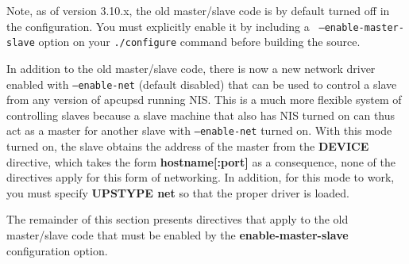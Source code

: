 Note, as of version 3.10.x, the old master/slave code is by default turned off
in the configuration. You must explicitly enable it by including a {\tt
--enable-master-slave} option on your {\tt ./configure} command before
building the source.  

In addition to the old master/slave code, there is now a new network driver
enabled with {\tt --enable-net} (default disabled) that can be used to control
a slave from any version of apcupsd running NIS. This is a much more flexible
system of controlling slaves because a slave machine that also has NIS turned
on can thus act as a master for another slave with {\tt --enable-net} turned
on. With this mode turned on, the slave obtains the address of the master from
the {\bf DEVICE} directive, which takes the form {\bf hostname[:port]} as a
consequence, none of the directives apply for this form of networking. In
addition, for this mode to work, you must specify {\bf UPSTYPE net} so that
the proper driver is loaded.  

The remainder of this section presents directives that apply to the old
master/slave code that must be enabled by the {\bf enable-master-slave}
configuration option.  

